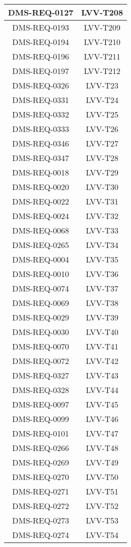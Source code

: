 \begin{longtable}{|c|c|}
DMS-REQ-0127 & LVV-T208\\\hline
DMS-REQ-0193 & LVV-T209\\\hline
DMS-REQ-0194 & LVV-T210\\\hline
DMS-REQ-0196 & LVV-T211\\\hline
DMS-REQ-0197 & LVV-T212\\\hline
DMS-REQ-0326 & LVV-T23\\\hline
DMS-REQ-0331 & LVV-T24\\\hline
DMS-REQ-0332 & LVV-T25\\\hline
DMS-REQ-0333 & LVV-T26\\\hline
DMS-REQ-0346 & LVV-T27\\\hline
DMS-REQ-0347 & LVV-T28\\\hline
DMS-REQ-0018 & LVV-T29\\\hline
DMS-REQ-0020 & LVV-T30\\\hline
DMS-REQ-0022 & LVV-T31\\\hline
DMS-REQ-0024 & LVV-T32\\\hline
DMS-REQ-0068 & LVV-T33\\\hline
DMS-REQ-0265 & LVV-T34\\\hline
DMS-REQ-0004 & LVV-T35\\\hline
DMS-REQ-0010 & LVV-T36\\\hline
DMS-REQ-0074 & LVV-T37\\\hline
DMS-REQ-0069 & LVV-T38\\\hline
DMS-REQ-0029 & LVV-T39\\\hline
DMS-REQ-0030 & LVV-T40\\\hline
DMS-REQ-0070 & LVV-T41\\\hline
DMS-REQ-0072 & LVV-T42\\\hline
DMS-REQ-0327 & LVV-T43\\\hline
DMS-REQ-0328 & LVV-T44\\\hline
DMS-REQ-0097 & LVV-T45\\\hline
DMS-REQ-0099 & LVV-T46\\\hline
DMS-REQ-0101 & LVV-T47\\\hline
DMS-REQ-0266 & LVV-T48\\\hline
DMS-REQ-0269 & LVV-T49\\\hline
DMS-REQ-0270 & LVV-T50\\\hline
DMS-REQ-0271 & LVV-T51\\\hline
DMS-REQ-0272 & LVV-T52\\\hline
DMS-REQ-0273 & LVV-T53\\\hline
DMS-REQ-0274 & LVV-T54\\\hline

\end{longtable}
